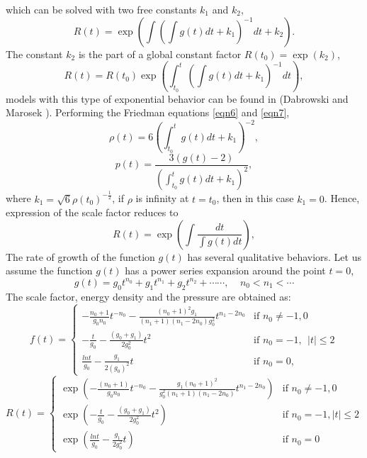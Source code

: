 \documentclass[11pt]{article}
\theoremstyle{theorem}
\theoremstyle{defi}
\begin{document}
which can be solved with two free constants $k_1$ and $k_2$,
\begin{equation}
\label{eqn19}
R(t)=\exp\left(\int\left(\int g(t)dt+k_1\right)^{-1}dt+k_2\right).
\end{equation}
The constant $k_2$ is the part of a global constant factor $R(t_0)=\exp(k_2)$,
\begin{equation}
\label{eqn20}
R(t)=R(t_0)\exp\left(\int_{t_0}^{t}\left(\int g(t)dt+k_1\right)^{-1}dt\right),
\end{equation}
models with this type of exponential behavior can be found in (Dabrowski and Marosek \cite{32}).
Performing the Friedman equations \eqref{eqn6} and \eqref{eqn7},
\begin{equation}
\label{eqn21}
\rho(t)=6\left(\int_{t_0}^{t}g(t)dt+k_1\right)^{-2},
\end{equation}
\begin{equation}
\label{eqn22}
p(t)=\frac{3(g(t)-2)}{\left(\int_{t_0}^{t}g(t)dt+k_1\right)^2},
\end{equation}
where $k_1=\sqrt{6}\rho(t_0)^{-\frac{1}{2}}$, if $\rho$ is infinity at $t=t_{0}$, then in this case $k_1=0$.
Hence, expression of the scale factor reduces to
\begin{equation}
\label{eqn23}
R(t)=\exp\left(\int\frac{dt}{\int g(t)dt}\right),
\end{equation}
The rate of growth of the function $g(t)$ has several qualitative behaviors. Let us assume the function $g(t)$ has a power series expansion around the point $t=0$,
\begin{equation}
\label{eqn24}
g(t)=g_{0}t^{n_0}+g_1t^{n_1}+g_2t^{n_2}+\cdots\cdots,~~~~~   n_0<n_1<\cdots
\end{equation}
The scale factor, energy density and the pressure are obtained as:
\begin{equation}
\label{eqn25}
f(t)=  \begin{cases} -\frac{n_{0}+1}{g_{0} n_{0}}t^{-n_{0}}-\frac{(n_{0}+1)^2 g_{1}}{(n_{1}+1)(n_{1}-2n_{0})g_{0}^2}t^{n_{1}-2n_{0}} &\mbox{if  } n_0\neq -1, 0  \\
-\frac{t}{g_{0}}-\frac{(g_{0}+g_{1})}{2g_{0}^2}t^2 & \mbox{if  }  n_0=-1,~~ |t|\le 2 \\
\frac{ln t}{g_0}-\frac{g_1}{2(g_0)^2}t & \mbox{if  } n_0=0,
\end{cases}
\end{equation}
\begin{equation}
\label{eqn26}
R(t)=\begin{cases}\exp\left(-\frac{(n_0+1)}{g_0n_0}t^{-n_0}
-\frac{g_1(n_0+1)^2}{g_0^2(n_1+1)(n_1-2n_0)}t^{n_1-2n_0}\right) & \mbox{if  } n_0\neq -1, 0\\
\exp\left(-\frac{t}{g_0}-\frac{(g_0+g_1)}{2g_0^2}t^2\right) & \mbox{if  } n_0=-1, |t|\leq2 \\
\exp\left(\frac{lnt}{g_0}-\frac{g_1}{2g_0^2}t\right)& \mbox{if  }  n_0=0
\end{cases}
\end{equation}
\end{document}
